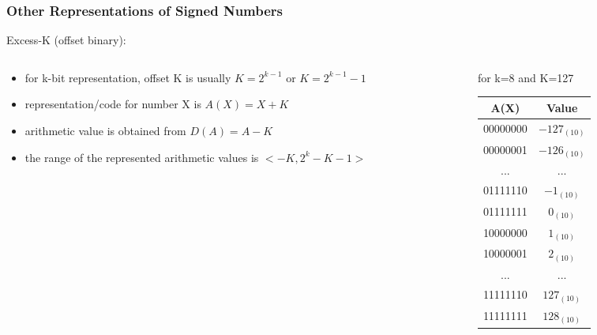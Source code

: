 \documentclass{beamer}
\begin{document}
\begin{frame}
\frametitle{Other Representations of Signed Numbers}

Excess-K (offset binary):

\begin{columns}
\begin{column}{0.5\textwidth}
\begin{itemize}
\item for k-bit representation, offset K is usually $K=2^{k-1}$ or $K=2^{k-1}-1$
\item representation/code for number X is $A(X) = X+K$
\item arithmetic value is obtained from $D(A) = A-K$
\item the range of the represented arithmetic values is $<-K, 2^{k}-K-1>$
\end{itemize}
\end{column}
\hfill
\begin{column}{0.5\textwidth}
for k=8 and K=127
\bigskip
\begin{tabular}{|c|c|}\hline
{\small A(X)}  & {\small Value} \\\hline
00000000 & $-127_{(10)}$ \\ \hline
00000001 & $-126_{(10)}$ \\ \hline
... & ... \\\hline
01111110 & $-1_{(10)}$ \\ \hline
01111111 & $0_{(10)}$ \\ \hline
10000000 & $1_{(10)}$ \\ \hline
10000001 & $2_{(10)}$ \\ \hline
... & ... \\\hline
11111110 & $127_{(10)}$ \\ \hline
11111111 & $128_{(10)}$ \\ \hline
\end{tabular}
\end{column}
\end{columns}

\end{frame}
\end{document}
